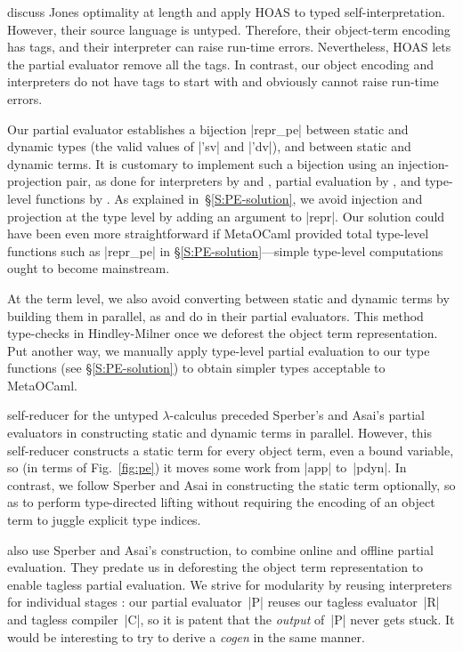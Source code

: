 \citet{Danvy-tagging-encoding} discuss Jones optimality at length and
apply HOAS to typed self\hyp interpretation.  However, their source
language is untyped.  Therefore, their object\hyp term encoding has
tags, and their interpreter can raise run-time errors.
Nevertheless, HOAS lets the partial
evaluator remove all the tags. In contrast, our object encoding and
interpreters do not have tags to start with and obviously cannot
raise run-time errors.

Our partial evaluator establishes a bijection |repr_pe| between static
and dynamic types (the valid values of |'sv| and |'dv|), and between
static and dynamic terms.  It is customary to implement such a bijection
using an injection\hyp projection pair, as done for interpreters
\ifshort \citep{Ramsey-ML-module-mania,Benton-embedded-interpreters}\else
by \citet{Ramsey-ML-module-mania} and \citet{Benton-embedded-interpreters}\fi,
partial evaluation \ifshort \citep{Danvy-TDPE}\else by \citet{Danvy-TDPE}\fi,
and type-level functions \ifshort \citep{oliveira-typecase}\else by
\citet{oliveira-typecase}\fi.  As explained in~\S\ref{S:PE-solution}, we
avoid injection and projection at the type level by adding an argument
to |repr|.
Our solution could have been even more straightforward if MetaOCaml
provided total type-level functions such as |repr_pe| in
\S\ref{S:PE-solution}---simple type-level computations 
ought to become mainstream.

At the term level, we also avoid converting between static and dynamic
terms by building them in parallel, as \citet{Sperber-SelfApplicable}
and \citet{asai-binding-time} do in their partial evaluators.
This method type-checks in Hindley-Milner once we
deforest the object term representation.  Put another way, we
manually apply type-level partial evaluation to our type
functions (see \S\ref{S:PE-solution}) to obtain simpler types 
acceptable to MetaOCaml.

 self-reducer for the untyped
$\lambda$-calculus preceded Sperber's and Asai's partial evaluators in constructing
static and dynamic terms in parallel.  However, this self-reducer
constructs a static term for every object term, even a bound variable,
so (in terms of Fig.~\ref{fig:pe}) it moves some work from |app|
to~|pdyn|.  In contrast, we follow Sperber and Asai in constructing the static term
optionally, so as to perform type-directed lifting without requiring the
encoding of an object term to juggle explicit type indices.

 also use Sperber and Asai's construction,
to combine online
and offline partial evaluation.
They predate us in deforesting the object term representation to enable tagless
partial evaluation.
We strive for modularity by reusing interpreters for individual stages
\citep{SperberThiemann:TwoForOne}: our partial evaluator~|P|
reuses our tagless evaluator~|R| and tagless compiler~|C|, so it
is patent that the \emph{output} of~|P| never gets
stuck.  It would be interesting
to try to derive a \emph{cogen} \citep{Thiemann:cogeninsixlines}
in the same manner.

